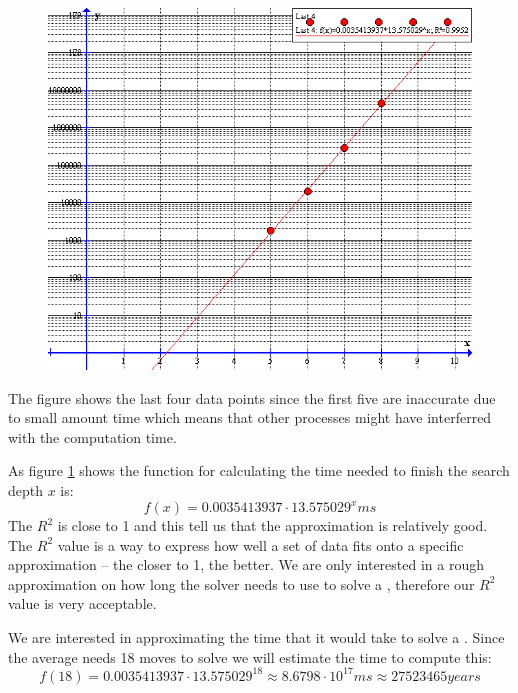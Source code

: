 \begin{figure}[tbh]
	\centering
		\includegraphics[scale=0.5]{input/pics/timeFunction}
	\caption{}
	\label{fig:timeFunction}
\end{figure}

The figure shows the last four data points since the first five are inaccurate due to small amount time which means that other processes might have interferred with the computation time.

As figure \ref{fig:timeFunction} shows the function for calculating the time needed to finish the search depth $x$ is:
\[
f(x)=0.0035413937 \cdot 13.575029^{x} ms
\]
The $R^2$ is close to 1 and this tell us that the approximation is relatively good. The $R^2$ value is a way to express how well a set of data fits onto a specific approximation -- the closer to 1, the better. We are only interested in a rough approximation on how long the solver needs to use to solve a \rubik{}, therefore our $R^2$ value is very acceptable.

We are interested in approximating the time that it would take to solve a \rubik{}. Since the average \rubik{} needs 18 moves to solve \cite{kociemba09} we will estimate the time to compute this:
\[
f(18) = 0.0035413937 \cdot 13.575029^{18} \approx 8.6798 \cdot 10^{17} ms \approx 27523465 years
\]

